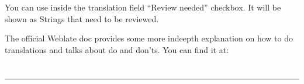 \documentclass[letterpaper,10pt,openany,oneside,english]{sphinxmanual}
\begin{document}
\sphinxAtStartPar
You can use inside the translation field “Review needed” checkbox. It will be shown as Strings that need to be reviewed.

\sphinxAtStartPar
The official Weblate doc provides some more in\sphinxhyphen{}deepth explanation on how to do translations and talks about do and don’ts. You can find it at: 


\chapter{}
\label{\detokenize{index:document-author-s}}

\bigskip\hrule\bigskip



\chapter{}
\label{\detokenize{index:datro-consortium}}


\renewcommand{\indexname}{Index}
\printindex
\end{document}
